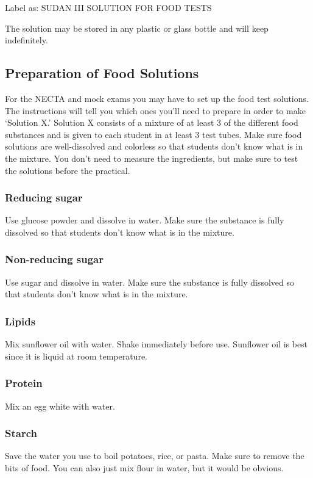 \noindent Label as: SUDAN III SOLUTION FOR FOOD TESTS

\noindent The solution may be stored in any plastic or glass bottle and will keep indefinitely.


\subsection{Preparation of Food Solutions}
For the NECTA and mock exams you may have to set up the food test solutions. The instructions will tell you which ones you'll need to prepare in order to make `Solution X.' Solution X consists of a mixture of at least 3 of the different food substances and is given to each student in at least 3 test tubes. Make sure food solutions are well-dissolved and colorless so that students don't know what is in the mixture. You don't need to measure the ingredients, but make sure to test the solutions before the practical.

\subsubsection{Reducing sugar}
Use glucose powder and dissolve in water. Make sure the substance is fully dissolved so that students don't know what is in the mixture.

\subsubsection{Non-reducing sugar}
Use sugar and dissolve in water. Make sure the substance is fully dissolved so that students don't know what is in the mixture.

\subsubsection{Lipids}
Mix sunflower oil with water. Shake immediately before use. Sunflower oil is best since it is liquid at room temperature.

\subsubsection{Protein}
Mix an egg white with water.

\subsubsection{Starch}
Save the water you use to boil potatoes, rice, or pasta. Make sure to remove the bits of food. You can also just mix flour in water, but it would be obvious.


